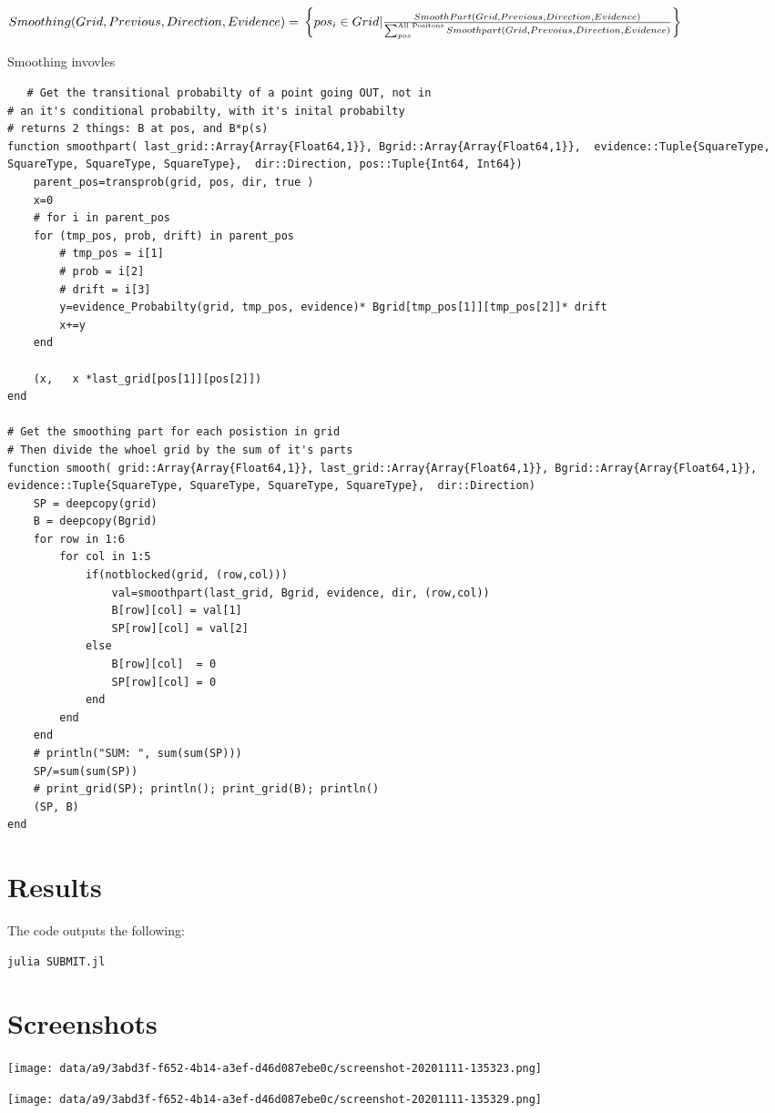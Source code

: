 \documentclass[11pt]{article}
\begin{document}
    \begin{math}
    Smoothing(Grid, Previous, Direction,Evidence) = \\
  \left\{pos_i \in Grid | \frac{SmoothPart(Grid, Previous,Direction, Evidence)}{\sum^{\text{All Positons}}_{pos} Smoothpart(Grid, Prevoius, Direction,Evidence)}  \right \}
\end{math}



Smoothing invovles

\begin{verbatim}
   # Get the transitional probabilty of a point going OUT, not in
# an it's conditional probabilty, with it's inital probabilty
# returns 2 things: B at pos, and B*p(s)
function smoothpart( last_grid::Array{Array{Float64,1}}, Bgrid::Array{Array{Float64,1}},  evidence::Tuple{SquareType, SquareType, SquareType, SquareType},  dir::Direction, pos::Tuple{Int64, Int64})
	parent_pos=transprob(grid, pos, dir, true )
	x=0
	# for i in parent_pos
	for (tmp_pos, prob, drift) in parent_pos
		# tmp_pos = i[1]
		# prob = i[2]
		# drift = i[3]
		y=evidence_Probabilty(grid, tmp_pos, evidence)* Bgrid[tmp_pos[1]][tmp_pos[2]]* drift
		x+=y
	end

	(x,   x *last_grid[pos[1]][pos[2]])
end

# Get the smoothing part for each posistion in grid
# Then divide the whoel grid by the sum of it's parts
function smooth( grid::Array{Array{Float64,1}}, last_grid::Array{Array{Float64,1}}, Bgrid::Array{Array{Float64,1}},  evidence::Tuple{SquareType, SquareType, SquareType, SquareType},  dir::Direction)
	SP = deepcopy(grid)
	B = deepcopy(Bgrid)
	for row in 1:6
		for col in 1:5
			if(notblocked(grid, (row,col)))
				val=smoothpart(last_grid, Bgrid, evidence, dir, (row,col))
				B[row][col] = val[1]
				SP[row][col] = val[2]
			else
				B[row][col]  = 0
				SP[row][col] = 0
			end
		end
	end
	# println("SUM: ", sum(sum(SP)))
	SP/=sum(sum(SP))
	# print_grid(SP); println(); print_grid(B); println()
	(SP, B)
end

\end{verbatim}
\section{Results}
\label{sec:org736d6d5}
The code outputs the following:
\begin{verbatim}
julia SUBMIT.jl
\end{verbatim}

\section{Screenshots}
\label{sec:org901cd2c}
\begin{center}
\texttt{[image: data/a9/3abd3f-f652-4b14-a3ef-d46d087ebe0c/screenshot-20201111-135323.png]}
\end{center}
\begin{center}
\texttt{[image: data/a9/3abd3f-f652-4b14-a3ef-d46d087ebe0c/screenshot-20201111-135329.png]}
\end{center}
\end{document}
